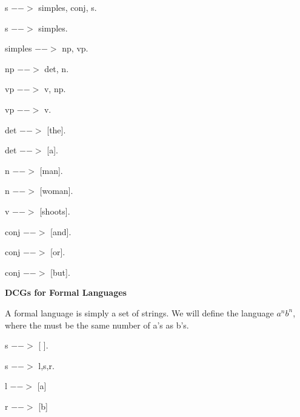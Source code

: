 \documentclass{article}
\begin{document}
s $-->$ simple\textunderscore s, conj, s.    
 
s $-->$ simple\textunderscore s. 

simple\textunderscore s $-->$ np, vp. 

np $-->$ det, n.      
         
vp $-->$ v, np.      
        
vp $-->$ v. 
 
det $-->$ [the].  
             
det $-->$ [a]. 

n $-->$ [man].  
            
n $-->$ [woman].   
         
v $-->$ [shoots]. 

conj $-->$ [and].    
      
conj $-->$ [or].    
        
conj $-->$ [but]. 


\textbf{DCGs for Formal Languages}

A formal language is simply a set of strings. We will define the language $a^nb^n$, where the must be the same number of a's as b's.

s $-->$ [ ].

s $-->$ l,s,r.

l $-->$ [a]

r $-->$ [b]



 
\end{document}

